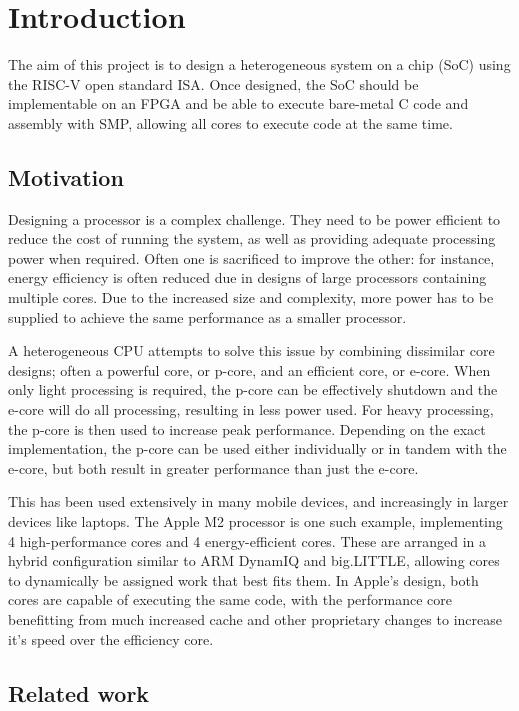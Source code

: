 \section{Introduction}
The aim of this project is to design a heterogeneous system on a chip (SoC) using the RISC-V open standard ISA\cite{riscv-1}\cite{riscv-2}. Once designed, the SoC should be implementable on an FPGA and be able to execute bare-metal C code and assembly with SMP, allowing all cores to execute code at the same time.

\subsection{Motivation}
Designing a processor is a complex challenge. They need to be power efficient to reduce the cost of running the system, as well as providing adequate processing power when required. Often one is sacrificed to improve the other: for instance, energy efficiency is often reduced due in designs of large processors containing multiple cores. Due to the increased size and complexity, more power has to be supplied to achieve the same performance as a smaller processor.

A heterogeneous CPU attempts to solve this issue by combining dissimilar core designs; often a powerful core, or p-core, and an efficient core, or e-core. When only light processing is required, the p-core can be effectively shutdown and the e-core will do all processing, resulting in less power used. For heavy processing, the p-core is then used to increase peak performance. Depending on the exact implementation, the p-core can be used either individually or in tandem with the e-core, but both result in greater performance than just the e-core.

This has been used extensively in many mobile devices, and increasingly in larger devices like laptops. The Apple M2 processor\cite{applem2} is one such example, implementing 4 high-performance cores and 4 energy-efficient cores. These are arranged in a hybrid configuration similar to ARM DynamIQ and big.LITTLE\cite{biglittle}, allowing cores to dynamically be assigned work that best fits them. In Apple's design, both cores are capable of executing the same code, with the performance core benefitting from much increased cache and other proprietary changes to increase it's speed over the efficiency core. 

\subsection{Related work}
